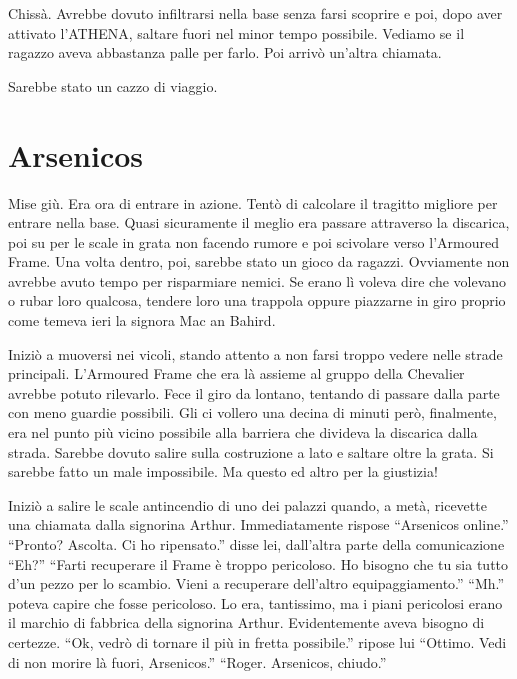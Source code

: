     Chissà. Avrebbe dovuto infiltrarsi nella base senza farsi scoprire e poi, dopo aver attivato l'ATHENA, saltare fuori
    nel minor tempo possibile. Vediamo se il ragazzo aveva abbastanza palle per farlo. Poi arrivò un'altra chiamata.

    Sarebbe stato un cazzo di viaggio.

  \section*{Arsenicos}

    Mise giù. Era ora di entrare in azione. Tentò di calcolare il tragitto migliore per entrare nella base. Quasi
    sicuramente il meglio era passare attraverso la discarica, poi su per le scale in grata non facendo rumore e poi
    scivolare verso l'Armoured Frame. Una volta dentro, poi, sarebbe stato un gioco da ragazzi. Ovviamente non avrebbe
    avuto tempo per risparmiare nemici. Se erano lì voleva dire che volevano o rubar loro qualcosa, tendere loro una
    trappola oppure piazzarne in giro proprio come temeva ieri la signora Mac an Bahird.

    Iniziò a muoversi nei vicoli, stando attento a non farsi troppo vedere nelle strade principali. L'Armoured Frame che
    era là assieme al gruppo della Chevalier avrebbe potuto rilevarlo. Fece il giro da lontano, tentando di passare
    dalla parte con meno guardie possibili. Gli ci vollero una decina di minuti però, finalmente, era nel punto più
    vicino possibile alla barriera che divideva la discarica dalla strada. Sarebbe dovuto salire sulla costruzione a
    lato e saltare oltre la grata. Si sarebbe fatto un male impossibile. Ma questo ed altro per la giustizia!

    Iniziò a salire le scale antincendio di uno dei palazzi quando, a metà, ricevette una chiamata dalla signorina
    Arthur. Immediatamente rispose ``Arsenicos online.'' ``Pronto? Ascolta. Ci ho ripensato.'' disse lei, dall'altra
    parte della comunicazione ``Eh?'' ``Farti recuperare il Frame è troppo pericoloso. Ho bisogno che tu sia tutto d'un
    pezzo per lo scambio. Vieni a recuperare dell'altro equipaggiamento.'' ``Mh.'' poteva capire che fosse pericoloso.
    Lo era, tantissimo, ma i piani pericolosi erano il marchio di fabbrica della signorina Arthur. Evidentemente aveva
    bisogno di certezze. ``Ok, vedrò di tornare il più in fretta possibile.'' ripose lui ``Ottimo. Vedi di non morire là
    fuori, Arsenicos.'' ``Roger. Arsenicos, chiudo.''

